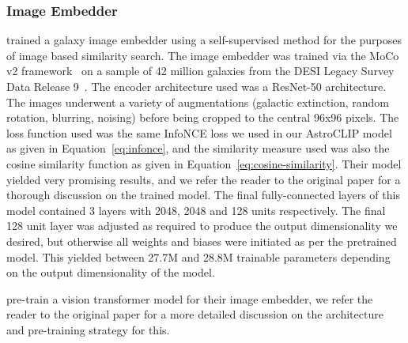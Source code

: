 \subsubsection{Image Embedder}\label{subsubsec:image-embedder}
\cite{stein2021} trained a galaxy image embedder using a self-supervised method for the purposes of image based similarity search.
The image embedder was trained via the MoCo v2 framework~\citep{moco2020, mocov22020} on a sample of 42 million galaxies
from the DESI Legacy Survey Data Release 9~\citep{desilegacy2018}.
The encoder architecture used was a ResNet-50 architecture.
The images underwent a variety of augmentations (galactic extinction, random rotation, blurring, noising) before
being cropped to the central 96x96 pixels.
The loss function used was the same InfoNCE loss we used in our AstroCLIP model as given in Equation~\eqref{eq:infonce},
and the similarity measure used was also the cosine similarity function as given in Equation~\eqref{eq:cosine-similarity}.
Their model yielded very promising results, and we refer the reader to the original paper for a thorough discussion
on the trained model.
The final fully-connected layers of this model contained 3 layers with 2048, 2048 and 128 units respectively.
The final 128 unit layer was adjusted as required to produce the output dimensionality we desired, but otherwise all
weights and biases were initiated as per the pretrained model.
This yielded between 27.7M and 28.8M trainable parameters depending on the output dimensionality of the model.

\cite{astroclip} pre-train a vision transformer model for their image embedder, we refer the reader to the original paper
for a more detailed discussion on the architecture and pre-training strategy for this.


